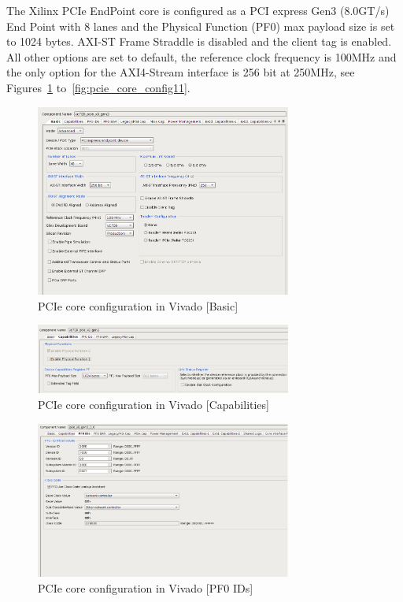 The Xilinx PCIe EndPoint core is configured as a PCI express Gen3 (8.0GT/s) End Point with 8 lanes and the Physical Function (PF0) max payload size is set to 1024 bytes. AXI-ST Frame Straddle is disabled and the client tag is enabled. All other options are set to default, the reference clock frequency is 100MHz and the only option for the AXI4-Stream interface is 256 bit at 250MHz, see Figures~\ref{fig:pcie_core_config1} to~\ref{fig:pcie_core_config11}.

\newpage

\begin{figure}[H]
\centering
\includegraphics[width=0.75\textwidth]{figures/pcie_core_basic.png}
\caption{PCIe core configuration in Vivado [Basic]}
\label{fig:pcie_core_config1}
\end{figure}

\begin{figure}[H]
\centering
\includegraphics[width=0.75\textwidth]{figures/pcie_core_config2.pdf}
\caption{PCIe core configuration in Vivado [Capabilities]}
\label{fig:pcie_core_config2}
\end{figure}

\begin{figure}[H]
\centering
\includegraphics[width=0.75\textwidth]{figures/pcie_core_config3.pdf}
\caption{PCIe core configuration in Vivado [PF0 IDs]}
\label{fig:pcie_core_config3}
\end{figure}


